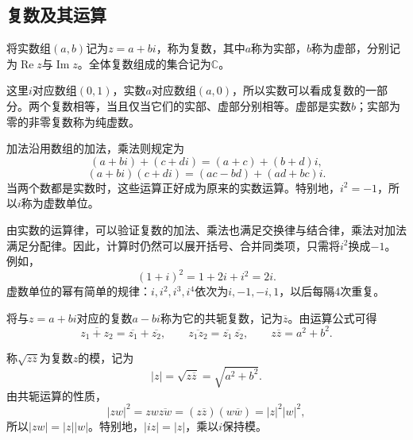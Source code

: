 \subsection{复数及其运算}
\begin{definition}\label{def:complex-number}
将实数组\(\left( a , b \right)\)记为\(z = a + b i\)，称为复数，其中\(a\)称为实部，\(b\)称为虚部，分别记为\(\operatorname{Re} z\)与\(\operatorname{Im} z\)。全体复数组成的集合记为\(\mathbb{C}\)。
\end{definition}

这里\(i\)对应数组\(\left( 0 , 1 \right)\)，实数\(a\)对应数组\(\left( a , 0 \right)\)，所以实数可以看成复数的一部分。两个复数相等，当且仅当它们的实部、虚部分别相等。虚部是实数\(b\)；实部为零的非零复数称为{\heiti{}纯虚数}。

加法沿用数组的加法，乘法则规定为
\begin{equation}
    \left( a + b i \right) + \left( c + d i \right) = \left( a + c \right) + \left( b + d \right) i ,
\end{equation}
\begin{equation}\label{eq:complex-product}
    \left( a + b i \right) \left( c + d i \right) = \left( a c - b d \right) + \left( a d + b c \right) i .
\end{equation}
当两个数都是实数时，这些运算正好成为原来的实数运算。特别地，\(i^{2} = - 1\)，所以\(i\)称为{\heiti{}虚数单位}。

由实数的运算律，可以验证复数的加法、乘法也满足交换律与结合律，乘法对加法满足分配律。因此，计算时仍然可以展开括号、合并同类项，只需将\(i^{2}\)换成\(- 1\)。例如，
\begin{equation}
    \left( 1 + i \right)^{2} = 1 + 2 i + i^{2} = 2 i .
\end{equation}
虚数单位的幂有简单的规律：\(i , i^{2} , i^{3} , i^{4}\)依次为\(i , - 1 , - i , 1\)，以后每隔\(4\)次重复。

将与\(z = a + b i\)对应的复数\(a - b i\)称为它的{\heiti{}共轭复数}，记为\(\overline{z}\)。由运算公式可得
\begin{equation}
    \overline{z_{1} + z_{2}} = \overline{z_{1}} + \overline{z_{2}} , \qquad
    \overline{z_{1} z_{2}} = \overline{z_{1}} \, \overline{z_{2}} , \qquad
    z \overline{z} = a^{2} + b^{2} .
\end{equation}

称\(\sqrt{z \overline{z}}\)为复数\(z\)的{\heiti{}模}，记为
\begin{equation}
    \left| z \right| = \sqrt{z \overline{z}} = \sqrt{a^{2} + b^{2}} .
\end{equation}
由共轭运算的性质，
\begin{equation}
    \left| z w \right|^{2} = z w \overline{z w}
    = \left( z \overline{z} \right) \left( w \overline{w} \right)
    = \left| z \right|^{2} \left| w \right|^{2} ,
\end{equation}
所以\(\left| z w \right| = \left| z \right| \left| w \right|\)。特别地，\(\left| i z \right| = \left| z \right|\)，乘以\(i\)保持模。

